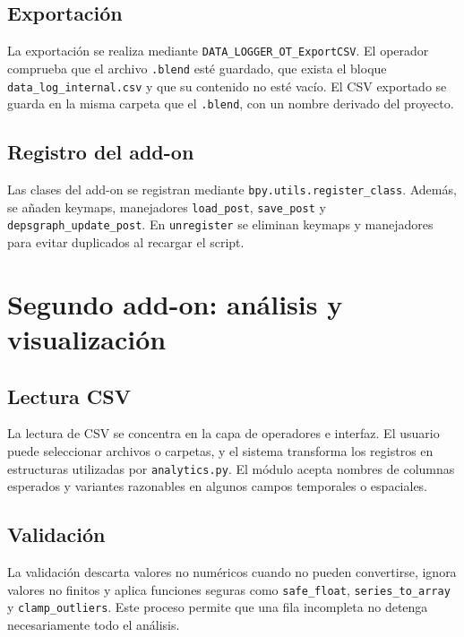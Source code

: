 \subsection{Exportación}
\label{subsec:d-logger-exportacion}

La exportación se realiza mediante \texttt{DATA\_LOGGER\_OT\_ExportCSV}. El operador comprueba que el archivo \texttt{.blend} esté guardado, que exista el bloque \texttt{data\_log\_internal.csv} y que su contenido no esté vacío. El CSV exportado se guarda en la misma carpeta que el \texttt{.blend}, con un nombre derivado del proyecto.

\subsection{Registro del add-on}
\label{subsec:d-logger-registro}

Las clases del add-on se registran mediante \texttt{bpy.utils.register\_class}. Además, se añaden keymaps, manejadores \texttt{load\_post}, \texttt{save\_post} y 
\texttt{depsgraph\_update\_post}. En \texttt{unregister} se eliminan keymaps y manejadores para evitar duplicados al recargar el script.

\section{Segundo add-on: análisis y visualización}
\label{sec:d-analisis}

\subsection{Lectura CSV}
\label{subsec:d-analisis-lectura}

La lectura de CSV se concentra en la capa de operadores e interfaz. El usuario puede seleccionar archivos o carpetas, y el sistema transforma los registros en estructuras utilizadas por \texttt{analytics.py}. El módulo acepta nombres de columnas esperados y variantes razonables en algunos campos temporales o espaciales.

\subsection{Validación}
\label{subsec:d-analisis-validacion}

La validación descarta valores no numéricos cuando no pueden convertirse, ignora valores no finitos y aplica funciones seguras como \texttt{safe\_float}, \texttt{series\_to\_array} y \texttt{clamp\_outliers}. Este proceso permite que una fila incompleta no detenga necesariamente todo el análisis.

